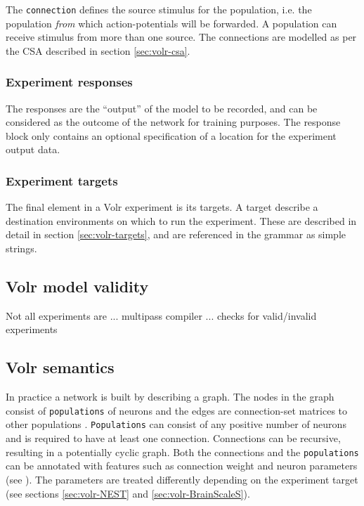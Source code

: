 The \texttt{connection} defines the source stimulus for the population,
i.e. the population \textit{from} which action-potentials will be forwarded.
A population can receive stimulus from more than one source.
The connections are modelled as per the \gls{CSA} described in section
\ref{sec:volr-csa}.


\subsubsection{Experiment responses}
The responses are the ``output'' of the model to be recorded, and can be
considered as the outcome of the network for training purposes.
The response block only contains an optional specification of a location for
the experiment output data.

\subsubsection{Experiment targets}
The final element in a Volr experiment is its targets.
A target describe a destination environments on which to run the experiment.
These are described in detail in section \ref{sec:volr-targets}, and are
referenced in the grammar as simple strings.

\pagebreak
\subsection{Volr model validity}
Not all experiments are
... multipass compiler
... checks for valid/invalid experiments

\subsection{Volr semantics}
In practice a network is built by describing a graph.
The nodes in the graph consist of \texttt{populations} of neurons and the edges
are connection-set matrices to other populations \autocite{Djurfeldt2012}.
\texttt{Populations} can consist of any positive number of neurons and is
required to have at least one connection.
Connections can be recursive, resulting in a potentially cyclic graph.
Both the connections and the \texttt{populations} can be annotated with features
such as connection weight and neuron parameters (see ).
The parameters are treated differently depending on the experiment target (see
sections \ref{sec:volr-NEST} and \ref{sec:volr-BrainScaleS}).

